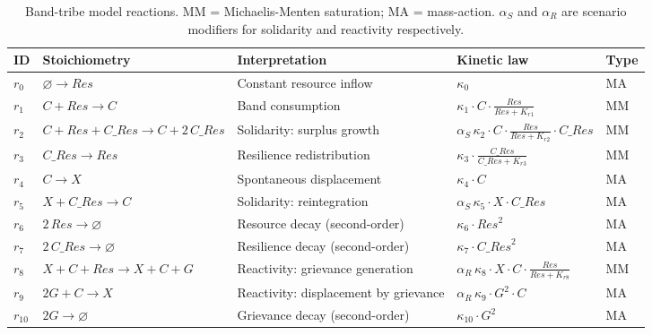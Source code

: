 \begin{table}[h]
\centering
\small
\caption{Band-tribe model reactions.  MM = Michaelis-Menten saturation;
         MA = mass-action.  $\alpha_S$ and $\alpha_R$ are scenario
         modifiers for solidarity and reactivity respectively.}
\label{tab:s3_reactions}
\begin{tabular}{lllll}
\toprule
ID   & Stoichiometry                        & Interpretation                 & Kinetic law         & Type \\
\midrule
$r_0$ & $\varnothing \to \textit{Res}$       & Constant resource inflow        & $\kappa_0$          & MA   \\
$r_1$ & $C + \textit{Res} \to C$             & Band consumption                & $\kappa_1 \cdot C \cdot \frac{\textit{Res}}{\textit{Res}+K_{r1}}$ & MM \\
$r_2$ & $C + \textit{Res} + C\_\textit{Res} \to C + 2\,C\_\textit{Res}$ & Solidarity: surplus growth & $\alpha_S\,\kappa_2 \cdot C \cdot \frac{\textit{Res}}{\textit{Res}+K_{r2}} \cdot C\_\textit{Res}$ & MM \\
$r_3$ & $C\_\textit{Res} \to \textit{Res}$   & Resilience redistribution       & $\kappa_3 \cdot \frac{C\_\textit{Res}}{C\_\textit{Res}+K_{r3}}$ & MM \\
$r_4$ & $C \to X$                             & Spontaneous displacement        & $\kappa_4 \cdot C$  & MA   \\
$r_5$ & $X + C\_\textit{Res} \to C$           & Solidarity: reintegration       & $\alpha_S\,\kappa_5 \cdot X \cdot C\_\textit{Res}$ & MA \\
$r_6$ & $2\,\textit{Res} \to \varnothing$     & Resource decay (second-order)   & $\kappa_6 \cdot \textit{Res}^2$ & MA \\
$r_7$ & $2\,C\_\textit{Res} \to \varnothing$  & Resilience decay (second-order) & $\kappa_7 \cdot C\_\textit{Res}^2$ & MA \\
$r_8$ & $X+C+\textit{Res} \to X+C+G$         & Reactivity: grievance generation & $\alpha_R\,\kappa_8 \cdot X \cdot C \cdot \frac{\textit{Res}}{\textit{Res}+K_{r8}}$ & MM \\
$r_9$ & $2G + C \to X$                        & Reactivity: displacement by grievance & $\alpha_R\,\kappa_9 \cdot G^2 \cdot C$ & MA \\
$r_{10}$ & $2G \to \varnothing$              & Grievance decay (second-order)  & $\kappa_{10} \cdot G^2$ & MA \\
\bottomrule
\end{tabular}
\end{table}

